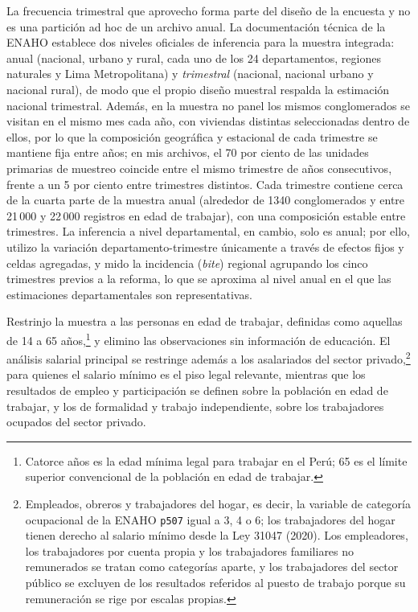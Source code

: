 La frecuencia trimestral que aprovecho forma parte del diseño de la encuesta y no es una partición ad hoc de un archivo anual. La documentación técnica de la ENAHO establece dos niveles oficiales de inferencia para la muestra integrada: anual (nacional, urbano y rural, cada uno de los 24 departamentos, regiones naturales y Lima Metropolitana) y \emph{trimestral} (nacional, nacional urbano y nacional rural), de modo que el propio diseño muestral respalda la estimación nacional trimestral. Además, en la muestra no panel los mismos conglomerados se visitan en el mismo mes cada año, con viviendas distintas seleccionadas dentro de ellos, por lo que la composición geográfica y estacional de cada trimestre se mantiene fija entre años; en mis archivos, el 70 por ciento de las unidades primarias de muestreo coincide entre el mismo trimestre de años consecutivos, frente a un 5 por ciento entre trimestres distintos. Cada trimestre contiene cerca de la cuarta parte de la muestra anual (alrededor de 1340 conglomerados y entre 21\,000 y 22\,000 registros en edad de trabajar), con una composición estable entre trimestres. La inferencia a nivel departamental, en cambio, solo es anual; por ello, utilizo la variación departamento-trimestre únicamente a través de efectos fijos y celdas agregadas, y mido la incidencia (\emph{bite}) regional agrupando los cinco trimestres previos a la reforma, lo que se aproxima al nivel anual en el que las estimaciones departamentales son representativas.

Restrinjo la muestra a las personas en edad de trabajar, definidas como aquellas de 14 a 65 años,\footnote{Catorce años es la edad mínima legal para trabajar en el Perú; 65 es el límite superior convencional de la población en edad de trabajar.} y elimino las observaciones sin información de educación. El análisis salarial principal se restringe además a los asalariados del sector privado,\footnote{Empleados, obreros y trabajadores del hogar, es decir, la variable de categoría ocupacional de la ENAHO \texttt{p507} igual a 3, 4 o 6; los trabajadores del hogar tienen derecho al salario mínimo desde la Ley 31047 (2020). Los empleadores, los trabajadores por cuenta propia y los trabajadores familiares no remunerados se tratan como categorías aparte, y los trabajadores del sector público se excluyen de los resultados referidos al puesto de trabajo porque su remuneración se rige por escalas propias.} para quienes el salario mínimo es el piso legal relevante, mientras que los resultados de empleo y participación se definen sobre la población en edad de trabajar, y los de formalidad y trabajo independiente, sobre los trabajadores ocupados del sector privado.

